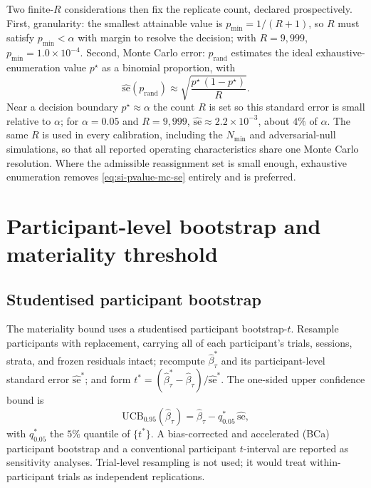 \documentclass[11pt,a4paper]{article}
\theoremstyle{definition}
\newcommand{\UCB}{\mathrm{UCB}_{0.95}}
\begin{document}
Two finite-\(R\) considerations then fix the replicate count, declared
prospectively. First, granularity: the smallest attainable value is
\(p_{\min}=1/(R+1)\), so \(R\) must satisfy \(p_{\min}<\alpha\) with margin to
resolve the decision; with \(R=9{,}999\), \(p_{\min}=1.0\times10^{-4}\). Second,
Monte Carlo error: \(p_{\mathrm{rand}}\) estimates the ideal
exhaustive-enumeration value \(p^\star\) as a binomial proportion, with
\begin{equation}
\label{eq:si-pvalue-mc-se}
\widehat{\mathrm{se}}(p_{\mathrm{rand}})\approx
\sqrt{\frac{p^\star\,(1-p^\star)}{R}} .
\end{equation}
Near a decision boundary \(p^\star\approx\alpha\) the count \(R\) is set so this
standard error is small relative to \(\alpha\); for \(\alpha=0.05\) and
\(R=9{,}999\), \(\widehat{\mathrm{se}}\approx2.2\times10^{-3}\), about \(4\%\) of
\(\alpha\). The same \(R\) is used in every calibration, including the
\(N_{\min}\) and adversarial-null simulations, so that all reported operating
characteristics share one Monte Carlo resolution. Where the admissible
reassignment set is small enough, exhaustive enumeration removes
\eqref{eq:si-pvalue-mc-se} entirely and is preferred.

\section{Participant-level bootstrap and materiality threshold}
\label{sec:si-bootstrap-materiality}

\subsection{Studentised participant bootstrap}
\label{sec:si-bootstrap}

The materiality bound uses a studentised participant bootstrap-\(t\). Resample
participants with replacement, carrying all of each participant's trials,
sessions, strata, and frozen residuals intact; recompute
\(\widehat{\beta}_\tau^{*}\) and its participant-level standard error
\(\widehat{\mathrm{se}}^{*}\); and form
\(t^{*}=(\widehat{\beta}_\tau^{*}-\widehat{\beta}_\tau)/\widehat{\mathrm{se}}^{*}\).
The one-sided upper confidence bound is
\begin{equation}
\label{eq:si-ucb}
\UCB(\widehat{\beta}_\tau)
=\widehat{\beta}_\tau-q^{*}_{0.05}\,\widehat{\mathrm{se}},
\end{equation}
with \(q^{*}_{0.05}\) the \(5\%\) quantile of \(\{t^{*}\}\). A bias-corrected and
accelerated (BCa) participant bootstrap and a conventional participant
\(t\)-interval are reported as sensitivity analyses. Trial-level resampling is not
used; it would treat within-participant trials as independent replications.
\end{document}
